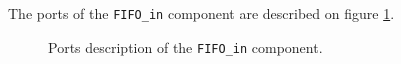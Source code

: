 \documentclass[11pt]{article}
\begin{document}
The ports of the \texttt{FIFO\_in} component are described on figure \ref{fifo_in_ports}.
\begin{figure}[H]
        \caption{Ports description of the \texttt{FIFO\_in} component.}
        \label{fifo_in_ports}
\end{figure}
\end{document}

